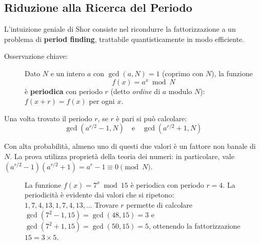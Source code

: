 \begin{onehalfspace}
\section{Riduzione alla Ricerca del Periodo}

L'intuizione geniale di Shor consiste nel ricondurre la fattorizzazione a un problema di \textbf{period finding}, trattabile quantisticamente in modo efficiente.

\begin{description}
    \item[Osservazione chiave:] Dato $N$ e un intero $a$ con $\gcd(a, N) = 1$ (coprimo con $N$), la funzione
    \begin{equation}
        f(x) = a^x \bmod N
    \end{equation}
    è \textbf{periodica} con periodo $r$ (detto \textit{ordine} di $a$ modulo $N$): $f(x+r) = f(x)$ per ogni $x$.
\end{description}

Una volta trovato il periodo $r$, se $r$ è pari si può calcolare:
\begin{equation}
    \gcd\!\left(a^{r/2} - 1, N\right) \quad \text{e} \quad \gcd\!\left(a^{r/2} + 1, N\right)
\end{equation}

Con alta probabilità, almeno uno di questi due valori è un fattore non banale di $N$. La prova utilizza proprietà della teoria dei numeri: in particolare, vale $(a^{r/2}-1)(a^{r/2}+1) = a^r - 1 \equiv 0 \pmod{N}$.

\begin{figure}[H]
\centering
{}
\caption[Periodicità di $f(x)=7^x \bmod 15$]{La funzione $f(x) = 7^x \bmod 15$ è periodica con periodo $r = 4$. La periodicità è evidente dai valori che si ripetono: $1, 7, 4, 13, 1, 7, 4, 13, \ldots$ Trovare $r$ permette di calcolare $\gcd(7^2 - 1, 15) = \gcd(48, 15) = 3$ e $\gcd(7^2 + 1, 15) = \gcd(50, 15) = 5$, ottenendo la fattorizzazione $15 = 3 \times 5$.}
\label{fig:period_finding}
\end{figure}


\end{onehalfspace}
